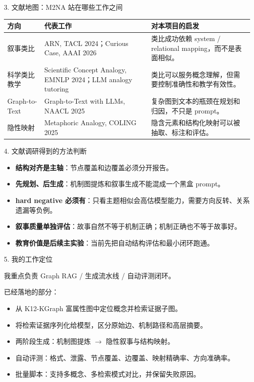 \documentclass[aspectratio=169,UTF8]{ctexbeamer}
\begin{document}
\begin{frame}{3. 文献地图：M2NA 站在哪些工作之间}
  \small
  \begin{tabularx}{\textwidth}{>{\raggedright\arraybackslash}p{} X X}
    \toprule
    方向 & 代表工作 & 对本项目的启发 \\
    \midrule
    叙事类比 & ARN, TACL 2024；Curious Case, AAAI 2026 & 类比成功依赖 system / relational mapping，而不是表面相似。 \\
    科学类比教学 & Scientific Concept Analogy, EMNLP 2024；LLM analogy tutoring & 类比可以服务概念理解，但需要控制准确性和教学有效性。 \\
    Graph-to-Text & Graph-to-Text with LLMs, NAACL 2025 & 复杂图到文本的瓶颈在规划和归因，不只是 prompt。 \\
    隐性映射 & Metaphoric Analogy, COLING 2025 & 隐含元素和结构化映射可以被抽取、标注和评估。 \\
    \bottomrule
  \end{tabularx}
\end{frame}

\begin{frame}{4. 文献调研得到的方法判断}
  \begin{itemize}
    \item \textbf{结构对齐是主轴}：节点覆盖和边覆盖必须分开报告。
    \item \textbf{先规划、后生成}：机制图提炼和叙事生成不能混成一个黑盒 prompt。
    \item \textbf{hard negative 必须有}：只看主题相似会高估模型能力，需要方向反转、关系遗漏等负例。
    \item \textbf{叙事质量单独评估}：故事自然不等于机制正确；机制正确也不等于故事好。
    \item \textbf{教育价值是后续主实验}：当前先把自动结构评估和最小闭环跑通。
  \end{itemize}
\end{frame}

\begin{frame}{5. 我的工作定位}
  \begin{block}{我重点负责}
    Graph RAG / 生成流水线 / 自动评测闭环。
  \end{block}

  \vspace{0.5em}
  已经落地的部分：
  \begin{itemize}
    \item 从 K12-KGraph 富属性图中定位概念并检索证据子图。
    \item 将检索证据序列化给模型，区分原始边、机制路径和高层摘要。
    \item 两阶段生成：机制图提炼 $\rightarrow$ 隐性叙事与结构映射。
    \item 自动评测：格式、泄露、节点覆盖、边覆盖、映射精确率、方向准确率。
    \item 批量脚本：支持多概念、多检索模式对比，并保留失败原因。
  \end{itemize}
\end{frame}
\end{document}
